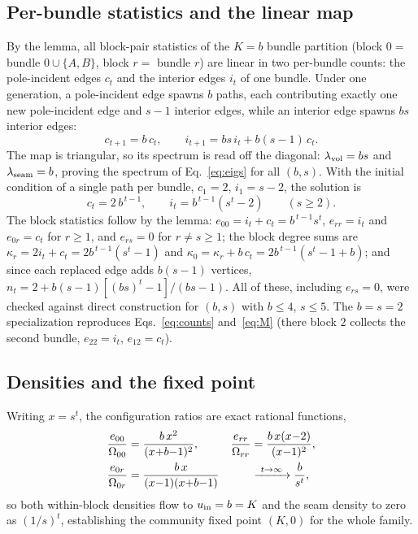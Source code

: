 \documentclass[preprint,12pt]{elsarticle}
\newcommand{\Om}{\Omega}
\begin{document}
\subsection{Per-bundle statistics and the linear map}
By the lemma, all
block-pair statistics of the $K{=}b$ bundle partition (block $0=$ bundle $0\cup
\{A,B\}$, block $r=$ bundle $r$) are linear in two per-bundle counts: the
pole-incident edges $c_t$ and the interior edges $i_t$ of one bundle. Under
one generation, a pole-incident edge spawns $b$ paths, each contributing
exactly one new pole-incident edge and $s\!-\!1$ interior edges, while an
interior edge spawns $bs$ interior edges:
\begin{equation}
  c_{t+1}=b\,c_t, \qquad i_{t+1}=bs\,i_t+b(s{-}1)\,c_t .
  \label{eq:recbs}
\end{equation}
The map is triangular, so its spectrum is read off the diagonal:
$\lambda_{\rm vol}=bs$ and $\lambda_{\rm seam}=b$, proving
the spectrum of Eq.~\eqref{eq:eigs} for all $(b,s)$. With the initial condition
of a single path per bundle, $c_1=2$, $i_1=s-2$, the solution is
\begin{equation}
  c_t=2\,b^{\,t-1}, \qquad i_t=b^{\,t-1}\!\left(s^t-2\right)
  \qquad (s\ge2).
  \label{eq:icbs}
\end{equation}
The block statistics follow by the lemma: $e_{00}=i_t+c_t=b^{\,t-1}s^t$,
$e_{rr}=i_t$ and $e_{0r}=c_t$ for $r\ge1$, and $e_{rs}=0$ for $r\neq s\ge1$;
the block degree sums are $\kappa_r=2i_t+c_t=2b^{\,t-1}(s^t{-}1)$ and
$\kappa_0=\kappa_r+b\,c_t=2b^{\,t-1}(s^t{-}1{+}b)$; and since each replaced
edge adds $b(s{-}1)$ vertices, $n_t=2+b(s{-}1)[(bs)^t{-}1]/(bs{-}1)$. All of
these, including $e_{rs}=0$, were checked against direct construction for
$(b,s)$ with $b\le4$, $s\le5$. The $b=s=2$ specialization reproduces
Eqs.~\eqref{eq:counts} and~\eqref{eq:M} (there block $2$ collects the second
bundle, $e_{22}=i_t$, $e_{12}=c_t$).

\subsection{Densities and the fixed point}
Writing $x=s^t$, the configuration
ratios are exact rational functions,
\begin{align}
  \frac{e_{00}}{\Om_{00}} &= \frac{b\,x^2}{(x{+}b{-}1)^2}, &
  \frac{e_{rr}}{\Om_{rr}} &= \frac{b\,x(x{-}2)}{(x{-}1)^2}, \notag\\
  \frac{e_{0r}}{\Om_{0r}} &= \frac{b\,x}{(x{-}1)(x{+}b{-}1)}
  &&\xrightarrow{\ t\to\infty\ } \frac{b}{s^t},
  \label{eq:ratiosbs}
\end{align}
so both within-block densities flow to $u_{\rm in}=b=K$ and the seam density
to zero as $(1/s)^t$, establishing the community fixed point $(K,0)$ for the
whole family.
\end{document}
